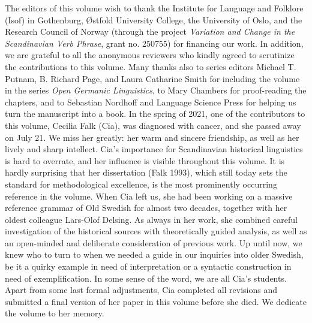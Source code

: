 The editors of this volume wish to thank the Institute for Language and Folklore (Isof) in Gothenburg, Østfold University College, the University of Oslo, and the Research Council of Norway (through the project \textit{Variation and Change in the Scandinavian Verb Phrase}, grant no. 250755) for financing our work. In addition, we are grateful to all the anonymous reviewers who kindly agreed to scrutinize the contributions to this volume. Many thanks also to series editors Michael T. Putnam, B. Richard Page, and Laura Catharine Smith for including the volume in the series \textit{Open Germanic Linguistics}, to Mary Chambers for proof-reading the chapters, and to Sebastian Nordhoff and Language Science Press for helping us turn the manuscript into a book.
In the spring of 2021, one of the contributors to this volume, Cecilia Falk (Cia), was diagnosed with cancer, and she passed away on July 21. We miss her greatly: her warm and sincere friendship, as well as her lively and sharp intellect. Cia’s importance for Scandinavian historical linguistics is hard to overrate, and her influence is visible throughout this volume. It is hardly surprising that her dissertation (Falk 1993), which still today sets the standard for methodological excellence, is the most prominently occurring reference in the volume. When Cia left us, she had been working on a massive reference grammar of Old Swedish for almost two decades, together with her oldest colleague Lars-Olof Delsing. As always in her work, she combined careful investigation of the historical sources with theoretically guided analysis, as well as an open-minded and deliberate consideration of previous work. Up until now, we knew who to turn to when we needed a guide in our inquiries into older Swedish, be it a quirky example in need of interpretation or a syntactic construction in need of exemplification. In some sense of the word, we are all Cia’s students.
Apart from some last formal adjustments, Cia completed all revisions and submitted a final version of her paper in this volume before she died. We dedicate the volume to her memory.